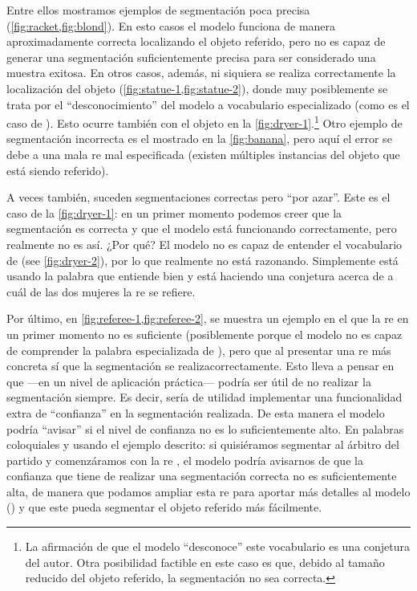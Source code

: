 Entre ellos mostramos ejemplos de segmentación poca precisa
(\vref{fig:racket,fig:blond}). En esto casos el modelo funciona de manera
aproximadamente correcta localizando el objeto referido, pero no es capaz de
generar una segmentación suficientemente precisa para ser considerado una
muestra exitosa. En otros casos, además, ni siquiera se realiza correctamente
la localización del objeto (\vref{fig:statue-1,fig:statue-2}), donde muy
posiblemente se trata por el ``desconocimiento'' del modelo a vocabulario
especializado (como es el caso de ). Esto ocurre también con el
objeto  en la \vref{fig:dryer-1}.\footnote{La afirmación de que
  el modelo ``desconoce'' este vocabulario es una conjetura del autor. Otra
  posibilidad factible en este caso es que, debido al tamaño reducido del
  objeto referido, la segmentación no sea correcta.} Otro ejemplo de
segmentación incorrecta es el mostrado en la \vref{fig:banana}, pero aquí el
error se debe a una mala \gls{re} mal especificada (existen múltiples
instancias del objeto que está siendo referido).

A veces también, suceden segmentaciones correctas pero ``por azar''. Este es el
caso de la \vref{fig:dryer-1}: en un primer momento podemos creer que la
segmentación es correcta y que el modelo está funcionando correctamente, pero
realmente no es así. ¿Por qué? El modelo no es capaz de entender el vocabulario
de  (see \vref{fig:dryer-2}), por lo que realmente no está
razonando. Simplemente está usando la palabra  que entiende bien y
está haciendo una conjetura acerca de a cuál de las dos mujeres la \gls{re} se
refiere.

Por último, en \vref{fig:referee-1,fig:referee-2}, se muestra un ejemplo en el
que la \gls{re} en un primer momento no es suficiente (posiblemente porque el
modelo no es capaz de comprender la palabra especializada de ),
pero que al presentar una \gls{re} más concreta sí que la segmentación se
realizacorrectamente. Esto lleva a pensar en que ---en un nivel de aplicación
práctica--- podría ser útil de no realizar la segmentación siempre. Es decir,
sería de utilidad implementar una funcionalidad extra de ``confianza'' en la
segmentación realizada. De esta manera el modelo podría ``avisar'' si el nivel
de confianza no es lo suficientemente alto. En palabras coloquiales y usando el
ejemplo descrito: si quisiéramos segmentar al árbitro del partido y
comenzáramos con la \gls{re} , el modelo podría
avisarnos de que la confianza que tiene de realizar una segmentación correcta
no es suficientemente alta, de manera que podamos ampliar esta \gls{re} para
aportar más detalles al modelo () y que
este pueda segmentar el objeto referido más fácilmente.
